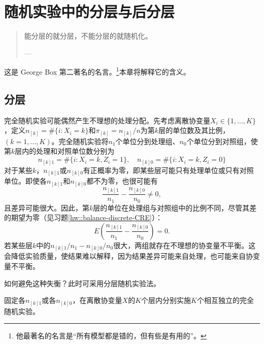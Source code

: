 
\chapter{随机实验中的分层与后分层}
\label{chapter::stratification-poststratification}

\begin{quotation}
能分层的就分层，不能分层的就随机化。  

--- \citet[][page 103]{box1978statistics}
\end{quotation}

这是 George Box 第二著名的名言。\footnote{他最著名的名言是“所有模型都是错的，但有些是有用的”\citep[][page 202]{box1979robustness}。}本章将解释它的含义。



\section{分层}



完全随机实验可能偶然产生不理想的处理分配。先考虑离散协变量$X_i   \in \{ 1, \ldots, K \}$，定义$n_{[k]} = \#\{ i: X_i    =k  \}$和$\pi_{[k]} = n_{[k]} / n$为第$k$层的单位数及其比例，$(k=1, \ldots, K)$。完全随机实验将$n_1$个单位分到处理组、$n_0$个单位分到对照组，使第$k$层内的处理和对照单位数分别为
$$
n_{[k]1} = \#\{ i: X_i   = k, Z_i = 1 \},\quad
n_{[k]0} = \#\{ i: X_i   = k, Z_i = 0 \}
$$
对于某些$k$，$n_{[k]1}$或$n_{[k]0}$有正概率为零，即某些层可能只有处理单位或只有对照单位。即使各$n_{[k]1}$和$n_{[k]0}$都不为零，也很可能有
\begin{equation}
\frac{  n_{[k]1} }{n_1}  -  \frac{  n_{[k]0} }{n_0} \neq 0 ,
\label{eq::covarianceimbK}
\end{equation}
且差异可能很大。因此，第$k$层的单位在处理组与对照组中的比例不同，尽管其差的期望为零（见习题\ref{hw::balance-discrete-CRE}）：
\begin{equation}\label{eq::balance-discrete-CRE}
E\left(  \frac{  n_{[k]1} }{n_1}  -  \frac{  n_{[k]0} }{n_0} \right) = 0.
\end{equation}
若某些层$k$中的$n_{[k]1}  / n_1  -  n_{[k]0} / n_0$很大，两组就存在不理想的协变量不平衡。这会降低实验质量，使结果难以解释，因为结果差异可能来自处理，也可能来自协变量不平衡。 



如何避免这种失衡？此时可采用分层随机实验法。

\begin{definition}[SRE]
\label{def::SRE}
固定各$n_{[k]1}$或各$n_{[k]0}$，在离散协变量$X$的$K$个层内分别实施$K$个相互独立的完全随机实验。
\end{definition}

